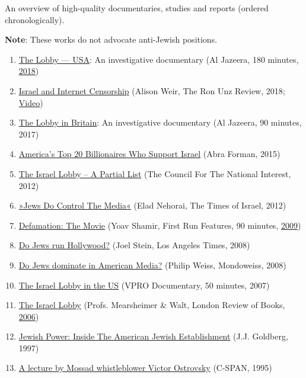 An overview of high-quality documentaries, studies and reports (ordered
chronologically).

\textbf{Note}: These works do not advocate anti-Jewish positions.

\begin{enumerate}
\def\labelenumi{\arabic{enumi}.}
\tightlist
\item
  \href{https://www.youtube.com/watch?v=MnzRsfMqOqI}{The Lobby --- USA}:
  An investigative documentary (Al Jazeera, 180 minutes,
  \href{https://electronicintifada.net/blogs/asa-winstanley/al-jazeera-denies-qatari-emir-censored-israel-lobby-film}{2018})
\item
  \href{http://www.unz.com/article/how-israel-and-its-partisans-work-to-censor-the-internet/}{Israel
  and Internet Censorship} (Alison Weir, The Ron Unz Review, 2018;
  \href{https://www.bitchute.com/video/GsNHqtjALSHJ/}{Video})
\item
  \href{https://www.youtube.com/watch?v=ceCOhdgRBoc}{The Lobby in
  Britain}: An investigative documentary (Al Jazeera, 90 minutes, 2017)
\item
  \href{https://www.breakingisraelnews.com/52318/exclusive-americas-top-20-richest-pro-israel-zionaires-technology-and-business/}{America's
  Top 20 Billionaires Who Support Israel} (Abra Forman, 2015)
\item
  \href{https://councilforthenationalinterest.org/?page_id=33}{The
  Israel Lobby -- A Partial List} (The Council For The National
  Interest, 2012)
\item
  \href{https://web.archive.org/web/20120705065748/http://blogs.timesofisrael.com/jews-do-control-the-media/}{»Jews
  Do Control The Media«} (Elad Nehorai, The Times of Israel, 2012)
\item
  \href{https://archive.org/details/Defamation}{Defamation: The Movie}
  (Yoav Shamir, First Run Features, 90 minutes,
  \href{https://en.wikipedia.org/wiki/Defamation_(film)}{2009})
\item
  \href{http://articles.latimes.com/2008/dec/19/opinion/oe-stein19}{Do
  Jews run Hollywood?} (Joel Stein, Los Angeles Times, 2008)
\item
  \href{https://mondoweiss.net/2008/02/do-jews-dominat/}{Do Jews
  dominate in American Media?} (Philip Weiss, Mondoweiss, 2008)
\item
  \href{https://www.youtube.com/watch?v=N294FMDok98}{The Israel Lobby in
  the US} (VPRO Documentary, 50 minutes, 2007)
\item
  \href{https://www.lrb.co.uk/v28/n06/john-mearsheimer/the-israel-lobby}{The
  Israel Lobby} (Profs. Mearsheimer \& Walt, London Review of Books,
  \href{https://en.wikipedia.org/wiki/The_Israel_Lobby_and_U.S._Foreign_Policy}{2006})
\item
  \href{https://www.amazon.com/Jewish-Power-Inside-American-Establishment/dp/0201327988}{Jewish
  Power: Inside The American Jewish Establishment} (J.J. Goldberg, 1997)
\item
  \href{https://archive.org/details/victor-ostrovsky-1995}{A lecture by
  Mossad whistleblower Victor Ostrovsky} (C-SPAN, 1995)
\end{enumerate}

